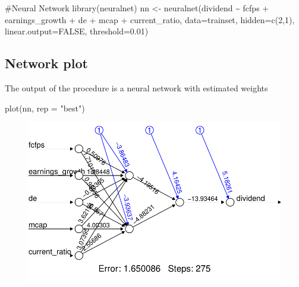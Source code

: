 \documentclass[
  letterpaper,
  DIV=11,
  numbers=noendperiod]{scrartcl}
\newenvironment{Shaded}{\begin{snugshade}}{\end{snugshade}}
\newcommand{\AttributeTok}[1]{\textcolor[rgb]{0.40,0.45,0.13}{#1}}
\newcommand{\CommentTok}[1]{\textcolor[rgb]{0.37,0.37,0.37}{#1}}
\newcommand{\ConstantTok}[1]{\textcolor[rgb]{0.56,0.35,0.01}{#1}}
\newcommand{\DecValTok}[1]{\textcolor[rgb]{0.68,0.00,0.00}{#1}}
\newcommand{\FloatTok}[1]{\textcolor[rgb]{0.68,0.00,0.00}{#1}}
\newcommand{\FunctionTok}[1]{\textcolor[rgb]{0.28,0.35,0.67}{#1}}
\newcommand{\NormalTok}[1]{\textcolor[rgb]{0.00,0.23,0.31}{#1}}
\newcommand{\OtherTok}[1]{\textcolor[rgb]{0.00,0.23,0.31}{#1}}
\newcommand{\SpecialCharTok}[1]{\textcolor[rgb]{0.37,0.37,0.37}{#1}}
\newcommand{\StringTok}[1]{\textcolor[rgb]{0.13,0.47,0.30}{#1}}
\begin{document}
\begin{Shaded}
\begin{Highlighting}[]
\CommentTok{\#Neural Network}
\FunctionTok{library}\NormalTok{(neuralnet)}
\NormalTok{nn }\OtherTok{\textless{}{-}} \FunctionTok{neuralnet}\NormalTok{(dividend }\SpecialCharTok{\textasciitilde{}}\NormalTok{ fcfps }\SpecialCharTok{+}\NormalTok{ earnings\_growth }\SpecialCharTok{+}\NormalTok{ de }\SpecialCharTok{+}\NormalTok{ mcap }\SpecialCharTok{+}\NormalTok{ current\_ratio, }
                \AttributeTok{data=}\NormalTok{trainset, }
                \AttributeTok{hidden=}\FunctionTok{c}\NormalTok{(}\DecValTok{2}\NormalTok{,}\DecValTok{1}\NormalTok{), }
                \AttributeTok{linear.output=}\ConstantTok{FALSE}\NormalTok{, }
                \AttributeTok{threshold=}\FloatTok{0.01}\NormalTok{)}
\end{Highlighting}
\end{Shaded}

\hypertarget{network-plot}{%
\subsection{Network plot}\label{network-plot}}

The output of the procedure is a neural network with estimated weights

\begin{Shaded}
\begin{Highlighting}[]
\FunctionTok{plot}\NormalTok{(nn, }\AttributeTok{rep =} \StringTok{"best"}\NormalTok{)}
\end{Highlighting}
\end{Shaded}

\begin{figure}[H]

{\centering \includegraphics{2-Intro2DeepLearning_files/figure-pdf/unnamed-chunk-14-1.pdf}

}

\end{figure}
\end{document}
